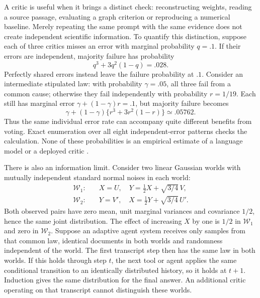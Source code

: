 A critic is useful when it brings a distinct check: reconstructing weights,
reading a source passage, evaluating a graph criterion or reproducing a
numerical baseline. Merely repeating the same prompt with the same evidence
does not create independent scientific information. To quantify this
distinction, suppose each of three critics misses an error with marginal
probability $q=.1$. If their errors are independent, majority failure has
probability
\begin{equation}
 q^3+3q^2(1-q)=.028.
 \label{exec13:architecture-majority}
\end{equation}
Perfectly shared errors instead leave the failure probability at $.1$.
Consider an intermediate stipulated law: with probability $\gamma=.05$,
all three fail from a common cause; otherwise they fail independently with
probability $r=1/19$. Each still has marginal error
$\gamma+(1-\gamma)r=.1$, but majority failure becomes
\begin{equation}
 \gamma+(1-\gamma)\{r^3+3r^2(1-r)\}\simeq .05762.
 \label{exec13:architecture-common-error}
\end{equation}
Thus the same individual error rate can accompany quite different benefits
from voting. Exact enumeration over all eight independent-error patterns
checks the calculation. None of these probabilities is an empirical estimate
of a language model or a deployed critic \citep{exec13_architecture_exact}.

There is also an information limit. Consider two linear Gaussian worlds with
mutually independent standard normal noises in each world:
\begin{align}
 \mathcal W_1:&\quad X=U,\quad Y=\tfrac12X+\sqrt{3/4}\,V,\nonumber\\
 \mathcal W_2:&\quad Y=V',\quad X=\tfrac12Y+\sqrt{3/4}\,U'.
 \label{exec13:architecture-worlds}
\end{align}
Both observed pairs have zero mean, unit marginal variances and covariance
$1/2$, hence the same joint distribution. The effect of increasing $X$ by
one is $1/2$ in $\mathcal W_1$ and zero in $\mathcal W_2$. Suppose an
adaptive agent system receives only samples from that common law, identical
documents in both worlds and randomness independent of the world. The first
transcript step then has the same law in both worlds. If this holds through
step $t$, the next tool or agent applies the same conditional transition to
an identically distributed history, so it holds at $t+1$. Induction gives the
same distribution for the final answer. An additional critic operating on
that transcript cannot distinguish these worlds.

